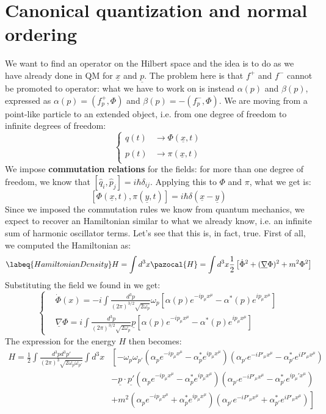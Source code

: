 \documentclass[../main.tex]{subfiles}
\begin{document}
\section{Canonical quantization and normal ordering}
We want to find an operator on the Hilbert space and the idea is to do as we have already done in QM for $\underline{x}$ and $\underline{p}$. The problem here is that $f^+$ and $f^-$ cannot be promoted to operator: what we have to work on is instead $\alpha(p)$ and $\beta(p)$, expressed as $\alpha(p)=(f^+_p,\Phi)$ and $\beta(p)=-(f^-_p,\Phi)$. We are moving from a point-like particle to an extended object, i.e. from one degree of freedom to infinite degrees of freedom:
\[
\left\{
\begin{aligned}
q(t)&\xrightarrow[]{}\Phi(\underline{x},t)\\
p(t)&\xrightarrow[]{}\pi(\underline{x},t)
\end{aligned}
\right.
\]
We impose \textbf{commutation relations} for the fields: for more than one degree of freedom, we know that $[\hat{q}_i,\hat{p}_j]=i\hbar\delta_{ij}$. Applying this to $\Phi$ and $\pi$, what we get is:
\[
[\Phi(\underline{x},t),\pi(\underline{y},t)]=i\hbar\delta(\underline{x}-\underline{y})
\]
Since we imposed the commutation rules we know from quantum mechanics, we expect to recover an Hamiltonian similar to what we already know, i.e. an infinite sum of harmonic oscillator terms. Let's see that this is, in fact, true. First of all, we computed the Hamiltonian as:
\begin{equation}
\labeq{HamiltonianDensity}
H=\int d^3x\pazocal{H}=\int d^3x\frac{1}{2}\left[\Dot{\Phi}^2+(\underline{\nabla}\Phi)^2+m^2\Phi^2\right]
\end{equation}
Substituting the field we found in  we get:
\[
\left\{
\begin{aligned}
&\Dot{\Phi}(x)=-i\int\frac{d^3p}{(2\pi)^{3/2}\sqrt{2\omega_p}}\omega_p[\alpha(p)e^{-ip_\mu x^\mu}-\alpha^*(p)e^{ip_\mu x^\mu}]\\
&\underline{\nabla}\Phi=i\int\frac{d^3p}{(2\pi)^{3/2}\sqrt{2\omega_p}}\underline{p}[\alpha(p)e^{-ip_\mu x^\mu}-\alpha^*(p)e^{ip_\mu x^\mu}]
\end{aligned}
\right.
\]
The expression for the energy $H$ then becomes:
\begin{align*}
    H=\frac{1}{2}\int \frac{d^3pd^3p'}{(2\pi)^3\sqrt{2\omega_p\omega_{p'}}}\int d^3x&\left[-\omega_p\omega_{p'}(\alpha_pe^{-ip_\mu x^\mu}-\alpha^*_pe^{ip_\mu x^\mu})(\alpha_{p'}e^{-iP'_\mu x^\mu}-\alpha^*_{p'}e^{iP'_\mu x^\mu})\right.\\
    &-\underline{p}\cdot\underline{p'}(\alpha_pe^{-ip_\mu x^\mu}-\alpha^*_pe^{ip_\mu x^\mu})(\alpha_{p'}e^{-iP'_\mu x^\mu}-\alpha^*_{p'}e^{ip_\mu 'x^\mu})\\
    &\left.+m^2(\alpha_pe^{-ip_\mu x^\mu}+\alpha^*_pe^{ip_\mu x^\mu})(\alpha_{p'}e^{-iP'_\mu x^\mu}+\alpha^*_{p'}e^{iP'_\mu x^\mu})\right]
\end{align*}
\end{document}
